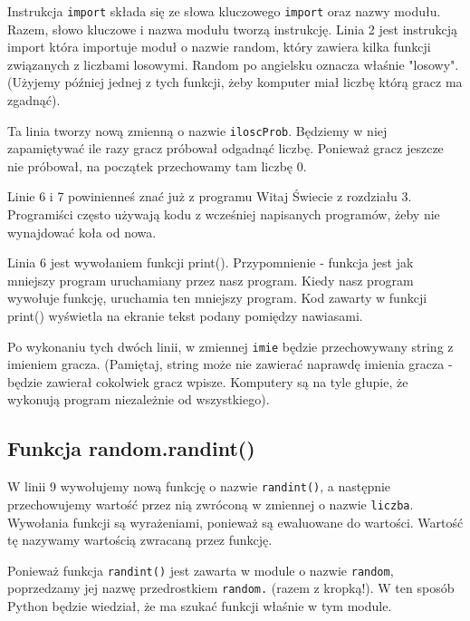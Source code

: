 \documentclass{book}
\begin{document}
Instrukcja \lstinline{import} składa się ze słowa kluczowego \lstinline{import} oraz nazwy modułu. Razem, słowo kluczowe i nazwa modułu tworzą instrukcję. Linia 2 jest instrukcją import która importuje moduł o nazwie random, który zawiera kilka funkcji związanych z liczbami losowymi. Random po angielsku oznacza właśnie "losowy". (Użyjemy później jednej z tych funkcji, żeby komputer miał liczbę którą gracz ma zgadnąć).



Ta linia tworzy nową zmienną o nazwie \lstinline{iloscProb}. Będziemy w niej zapamiętywać ile razy gracz próbował odgadnąć liczbę. Ponieważ gracz jeszcze nie próbował, na początek przechowamy tam liczbę 0.



Linie 6 i 7 powinienneś znać już z programu Witaj Świecie z rozdziału 3. Programiści często używają kodu z wcześniej napisanych programów, żeby nie wynajdować koła od nowa.

Linia 6 jest wywołaniem funkcji print(). Przypomnienie - funkcja jest jak mniejszy program uruchamiany przez nasz program. Kiedy nasz program wywołuje funkcję, uruchamia ten mniejszy program. Kod zawarty w funkcji print() wyświetla na ekranie tekst podany pomiędzy nawiasami.

Po wykonaniu tych dwóch linii, w zmiennej \lstinline{imie} będzie przechowywany string z imieniem gracza. (Pamiętaj, string może nie zawierać naprawdę imienia gracza - będzie zawierał cokolwiek gracz wpisze. Komputery są na tyle głupie, że wykonują program niezależnie od wszystkiego).

\subsection{Funkcja random.randint()}



W linii 9 wywołujemy nową  funkcję o nazwie \lstinline{randint()}, a następnie przechowujemy wartość przez nią zwróconą w zmiennej o nazwie \lstinline{liczba}. Wywołania funkcji są wyrażeniami, ponieważ są ewaluowane do wartości. Wartość tę nazywamy wartością zwracaną przez funkcję.

Ponieważ funkcja \lstinline{randint()} jest zawarta w module o nazwie \lstinline{random}, poprzedzamy jej nazwę przedrostkiem \lstinline{random.} (razem z kropką!). W ten sposób Python będzie wiedział, że ma szukać funkcji właśnie w tym module.
\end{document}
